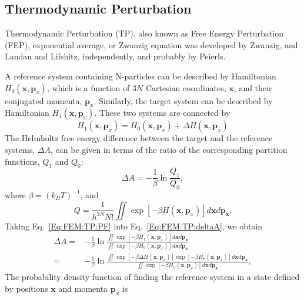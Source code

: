 \subsection{Thermodynamic Perturbation\label{Sec:FEM:TP}}
Thermodynamic Perturbation (TP), also known as Free Energy Perturbation (FEP), exponential average, or Zwanzig equation was developed by Zwanzig,\cite{ZwanzigJCP1954} and Landau and Lifshitz, independently, and probably by Peierls\cite{JorgensenJCTC2008}. 

A reference system containing N-particles can be described by Hamiltonian $H_{0}(\mathbf{x},\mathbf{p}_{x})$, which is a function of $3N$ Cartesian coordinates, $\mathbf{x}$, and their conjugated momenta, $\mathbf{p}_{x}$. Similarly, the target system can be described by Hamiltonian $H_{1}(\mathbf{x},\mathbf{p}_{x})$. These two systems are connected by 
\begin{equation}
H_{1}(\mathbf{x},\mathbf{p}_{x}) = H_{0}(\mathbf{x},\mathbf{p}_{x}) + \Delta H (\mathbf{x},\mathbf{p}_{x})
\label{Eq:FEM:TP:deltaH}
\end{equation}
The Helmholtz free energy difference between the target and the reference systems, $\Delta A$, can be given in terms of the ratio of the corresponding partition functions, $Q_{1}$ and $Q_{0}$:
\begin{equation}
\Delta A  =  -\frac{1}{\beta}\ln\frac{Q_{1}}{Q_{0}},
\label{Eq:FEM:TP:deltaA}
\end{equation}
where $\beta = {(k_{B}T)}^{-1}$, and
\begin{equation}
Q = \frac{1}{{h}^{3N}N!} \iint \exp\left[-\beta H(\mathbf{x},\mathbf{p}_{x})\right] d\mathbf{x}d\mathbf{p}_\mathbf{x}.
\label{Eq:FEM:TP:PF}
\end{equation}
Taking Eq.~\ref{Eq:FEM:TP:PF} into Eq.~\ref{Eq:FEM:TP:deltaA}, we obtain
\begin{align}
\Delta A  =&  -\frac{1}{\beta}\ln{\frac{\iint \exp\left[-\beta H_{1}(\mathbf{x},\mathbf{p}_{x})\right] d\mathbf{x}d\mathbf{p}_\mathbf{x}}{\iint \exp\left[-\beta H_{0}(\mathbf{x},\mathbf{p}_{x}) \right] d\mathbf{x}d\mathbf{p}_\mathbf{x}}}\\
=& -\frac{1}{\beta}\ln{\frac{\iint \exp\left[-\beta \Delta H(\mathbf{x},\mathbf{p}_{x})\right] \exp\left[-\beta H_{0}(\mathbf{x},\mathbf{p}_{x})\right] d\mathbf{x}d\mathbf{p}_\mathbf{x}}{\iint \exp\left[-\beta H_{0}(\mathbf{x},\mathbf{p}_{x})\right] d\mathbf{x}d\mathbf{p}_\mathbf{x}}},
\label{Eq:FEM:TP:deltaA2}
\end{align}
The probability density function of finding the reference system in a state defined by positions $\mathbf{x}$ and momenta $\mathbf{p}_{x}$ is 
